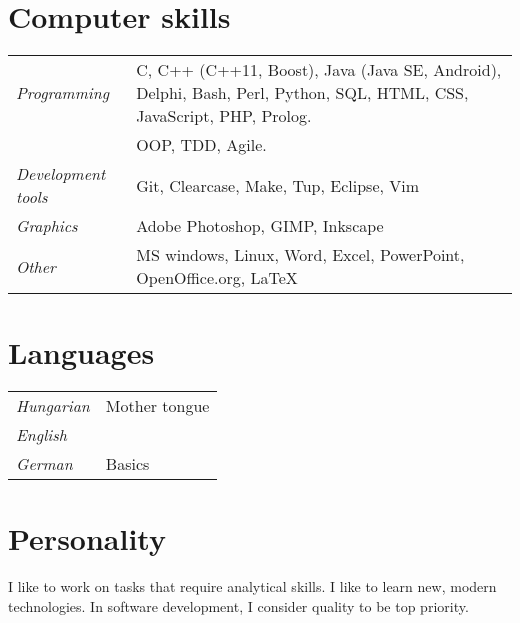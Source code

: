 \documentclass[a4paper,10pt]{article}
\newcommand{\pont}[1]{\emph{#1}}
\begin{document}
\section*{Computer skills}
\begin{tabular}{lp{12cm}}
 \pont{Programming}&C, C++ (C++11, Boost), Java (Java SE, Android), Delphi, Bash, Perl, Python, SQL, HTML, CSS, JavaScript, PHP, Prolog.\\
 &OOP, TDD, Agile.\\
 \pont{Development tools}&Git, Clearcase, Make, Tup, Eclipse, Vim\\
 \pont{Graphics}&Adobe Photoshop, GIMP, Inkscape\\
 \pont{Other}&MS windows, Linux, Word, Excel, PowerPoint, OpenOffice.org, LaTeX
\end{tabular}

\section*{Languages}
\begin{tabular}{ll}
 \pont{Hungarian}&Mother tongue\\
 \pont{English}\\
 \pont{German}&Basics
\end{tabular}

\section*{Personality}
I like to work on tasks that require analytical skills. I like to learn new, modern technologies. In software development, I consider quality to be top priority.
\end{document}
